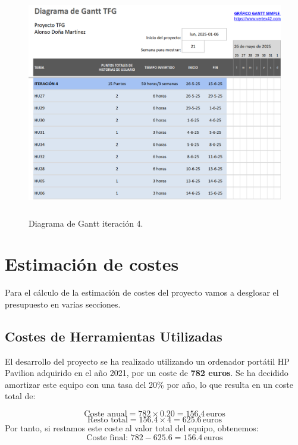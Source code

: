 \begin{figure}[H]
    \centering
    \includegraphics[width=1\textwidth, height=10cm]{fotos/iter4.png}
    \caption{Diagrama de Gantt iteración 4\textbf{}.}
    \label{fig:gantt4}
\end{figure}
\section{Estimación de costes}
Para el cálculo de la estimación de costes del proyecto vamos a desglosar el presupuesto en varias secciones.

\subsection{Costes de Herramientas Utilizadas}
El desarrollo del proyecto se ha realizado utilizando un ordenador portátil HP Pavilion adquirido en el año 2021, por un coste de \textbf{782 euros}. Se ha decidido amortizar este equipo con una tasa del 20\% por año, lo que resulta en un coste total de:

\begin{equation*}
    \text{Coste anual} = 782 \times 0.20 = 156.4 \, \text{euros}
\end{equation*}
\begin{equation*}
    \text{Resto total} = 156.4 \times 4 = 625.6 \, \text{euros}
\end{equation*}
Por tanto, si restamos este coste al valor total del equipo, obtenemos:
\begin{equation*}
     \text{Coste final: } 782 - 625.6 = 156.4 \, \text{euros}
\end{equation*}

